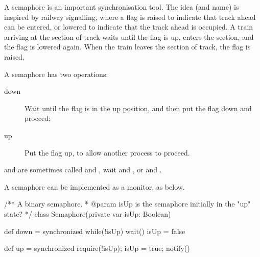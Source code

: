 
\begin{slide}

A semaphore is an important synchronisation tool.  The idea (and name) is
inspired by railway signalling, where a flag is raised to indicate that track
ahead can be entered, or lowered to indicate that the track ahead is occupied.
A train arriving at the section of track waits until the flag is up, enters
the section, and the flag is lowered again.  When the train leaves the section
of track, the flag is raised. 

A semaphore 
has two operations:
%
\begin{description}
\item[{down}]
Wait until the flag is in the up position, and then put the flag down and
procced;

\item[{up}]
Put the flag up, to allow another process to proceed.
\end{description}

 and  are sometimes called  and ,
{\codecolour\sf wait} and , or  and
. 
\end{slide}


\begin{slide}

A semaphore can be implemented as a monitor, as below.
%
\begin{scala}
/** A binary semaphore.
  * @param isUp is the semaphore initially in the "up" state? */
class Semaphore(private var isUp: Boolean){
  def down = synchronized{
    while(!isUp) wait()
    isUp = false
  }

  def up = synchronized{
    require(!isUp); isUp = true; notify()
  }
}
\end{scala}
\end{slide}



